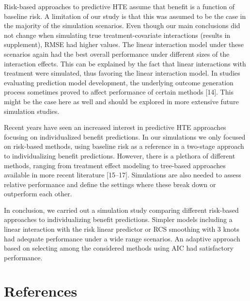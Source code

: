 \documentclass{article}
\begin{document}
Risk-based approaches to predictive HTE assume that benefit is a
function of baseline risk. A limitation of our study is that this was
assumed to be the case in the majority of the simulation scenarios. Even
though our main conclusions did not change when simulating true
treatment-covariate interactions (results in supplement), RMSE had
higher values. The linear interaction model under these scenarios again
had the best overall performance under different sizes of the
interaction effects. This can be explained by the fact that linear
interactions with treatment were simulated, thus favoring the linear
interaction model. In studies evaluating prediction model development,
the underlying outcome generation process sometimes proved to affect
performance of certain methods {[}14{]}. This might be the case here as
well and should be explored in more extensive future simulation studies.

Recent years have seen an increased interest in predictive HTE
approaches focusing on individualized benefit predictions. In our
simulations we only focused on risk-based methods, using baseline risk
as a reference in a two-stage approach to individualizing benefit
predictions. However, there is a plethora of different methods, ranging
from treatment effect modeling to tree-based approaches available in
more recent literature {[}15--17{]}. Simulations are also needed to
assess relative performance and define the settings where these break
down or outperform each other.

In conclusion, we carried out a simulation study comparing different
risk-based approaches to individualizing benefit predictions. Simpler
models including a linear interaction with the risk linear predictor or
RCS smoothing with 3 knots had adequate performance under a wide range
scenarios. An adaptive approach based on selecting among the considered
methods using AIC had satisfactory performance.

\newpage

\hypertarget{references}{%
\section{References}\label{references}}

\nolinenumbers
\setlength{\parindent}{-0.25in}
\setlength{\leftskip}{0.25in}

\noindent
\end{document}

